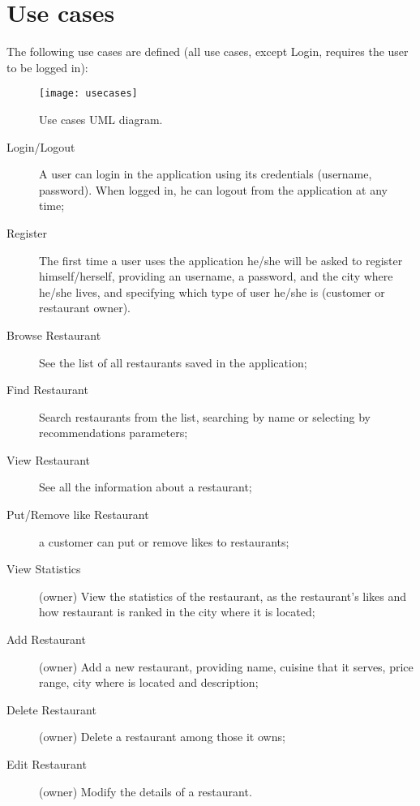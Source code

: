 \chapter{Use cases}\label{ch:usecases}

The following use cases are defined (all use cases, except Login, requires
the user to be logged in):

\begin{figure}[p]
	\texttt{[image: usecases]}
	\caption{Use cases UML diagram.}\label{fig:usecases}
\end{figure}

\begin{description}
	\item[Login/Logout] A user can login in the application using its
		credentials (username, password). When logged in, he can logout
		from the application at any time;
	\item[Register] The first time a user uses the application he/she will
		be asked to register himself/herself, providing an username, a
		password, and the city where he/she lives, and specifying which
		type of user he/she is (customer or restaurant owner).
	\item[Browse Restaurant] See the list of all restaurants saved in the
		application;
	\item[Find Restaurant] Search restaurants from the list, searching by
		name or selecting by recommendations parameters;
	\item[View Restaurant] See all the information about a restaurant;
	\item[Put/Remove like Restaurant] a customer can put or remove likes to
		restaurants;
	\item[View Statistics] (owner) View the statistics of the restaurant, as
		the  restaurant’s likes and  how  restaurant is ranked in the
		city where it is located;
	\item[Add Restaurant] (owner) Add a new restaurant, providing name,
		cuisine that it serves, price range, city where is located and
		description;
	\item[Delete Restaurant] (owner) Delete a restaurant among those it
		owns;
	\item[Edit Restaurant] (owner) Modify the details of a restaurant.


\end{description}
